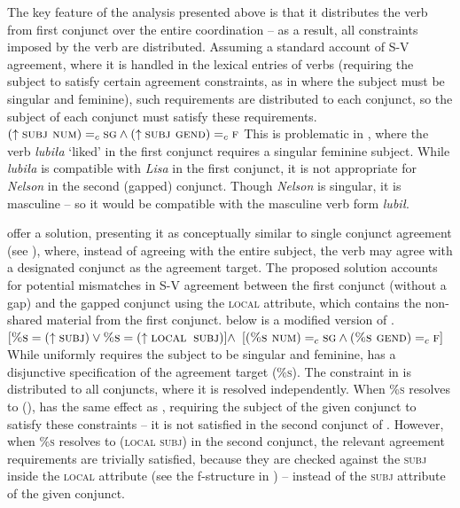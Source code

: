 \documentclass[output=paper]{../langscibook}
\begin{document}
The key feature of the analysis presented above is that it distributes
the verb from first conjunct over the entire coordination – as a
result, all constraints imposed by the verb are distributed. Assuming
a standard account of S-V agreement, where it is handled in the
lexical entries of verbs (requiring the subject to satisfy certain
agreement constraints, as in  where the subject
must be singular and feminine), such requirements are distributed to
each conjunct, so the subject of each conjunct must satisfy these
requirements.
\ea\label{ex:pat:prz:17:31}
  $(\uparrow \textsc{subj num}) =_c \textsc{sg} \land (\uparrow \textsc{subj gend}) =_c \textsc{f}$
\z
This is problematic in , where the verb
\emph{lubiła} `liked' in the first conjunct requires a singular feminine
subject. While \emph{lubiła} is compatible with \emph{Lisa} in the first
conjunct, it is not appropriate for \emph{Nelson} in the second
(gapped) conjunct. Though \emph{Nelson} is singular, it is masculine – so it would
be compatible with the masculine verb form \emph{lubił}.

\citet{PatejukPrzepiorkowski2017} offer a solution, presenting it as
conceptually similar to single conjunct agreement (see ), where,
instead of agreeing with the entire subject, the verb may agree with a
designated conjunct as the agreement target. The proposed solution
accounts for potential mismatches in S-V agreement between the first
conjunct (without a gap) and the gapped conjunct using the
\textsc{local} attribute, which contains the non-shared material from
the first conjunct.  below is a modified version of
.
\ea\label{ex:pat:prz:17:33}
  $[\textsc{\%s}=(\uparrow \textsc{subj}) \lor \textsc{\%s}=(\uparrow \textsc{local~\,subj})] \land$\newline
  $[(\textsc{\%s num}) =_c \textsc{sg} \land (\textsc{\%s gend}) =_c \textsc{f}]$
\z
While  uniformly requires the subject to be
singular and feminine,  has a disjunctive
specification of the agreement target (\textsc{\%s}). The constraint
in  is distributed to all conjuncts, where it
is resolved independently. When \textsc{\%s} resolves to \textsc{(\UP\SUBJ)},
 has the same effect as
, requiring the subject of the given conjunct
to satisfy these constraints – it is not satisfied in
the second conjunct of . However, when
\textsc{\%s} resolves to \textsc{(\UP local subj)} in the second conjunct,
the relevant agreement requirements are trivially satisfied, because they are
checked against the \textsc{subj} inside the \textsc{local} attribute
(see the f-structure in ) – instead of the
\textsc{subj} attribute of the given conjunct.
\end{document}
